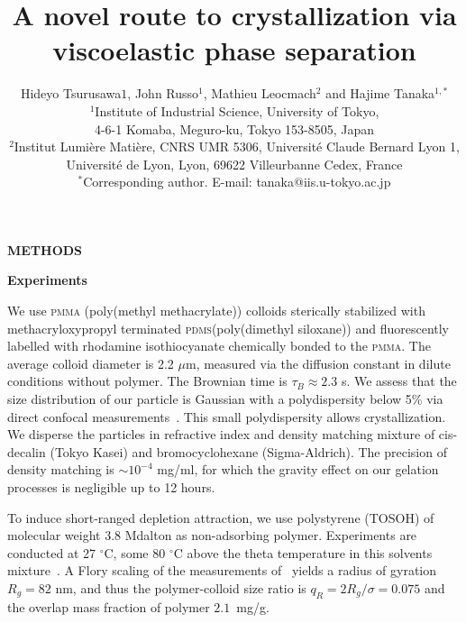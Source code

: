 \documentclass[12pt,onecolumn]{revtex4}
\begin{document}
\title{A novel route to crystallization via viscoelastic phase separation} 

\author{Hideyo Tsurusawa$1$, John Russo$^1$, Mathieu Leocmach$^{2}$ and Hajime Tanaka$^{1,\ast}$ 
\\
\normalsize{$^1$Institute of Industrial Science, University of Tokyo,}\\
\normalsize{4-6-1 Komaba, Meguro-ku, Tokyo 153-8505, Japan}\\
\normalsize{$^2$Institut Lumière Matière, CNRS UMR 5306, Université Claude Bernard Lyon 1, }\\
\normalsize{Université de Lyon, Lyon, 69622 Villeurbanne Cedex, France}\\
\normalsize{$^\ast$Corresponding author. E-mail: tanaka@iis.u-tokyo.ac.jp}}

\maketitle



\noindent
{\bf METHODS}

\noindent
{\bf Experiments}

We use \textsc{pmma} (poly(methyl methacrylate)) colloids sterically stabilized with methacryloxypropyl terminated \textsc{pdms}(poly(dimethyl siloxane)) and fluorescently labelled with rhodamine isothiocyanate chemically bonded to the \textsc{pmma}. 
The average colloid diameter is 2.2 $\mu$m, measured via the diffusion constant in dilute conditions without polymer. The Brownian time is $\tau_B \approx 2.3$ s. 
We assess that the size distribution of our particle is Gaussian with a polydispersity below 5\% via direct confocal measurements~\cite{Leocmach2013}.
This small polydispersity allows crystallization.
We disperse the particles in refractive index and density matching mixture of cis-decalin (Tokyo Kasei) and bromocyclohexane (Sigma-Aldrich). 
The precision of density matching is $\sim 10^{-4}$ mg/ml, for which the gravity effect on our gelation processes is negligible up to 12 hours.

To induce short-ranged depletion attraction, we use polystyrene (TOSOH) of molecular weight 3.8 Mdalton as non-adsorbing polymer. 
Experiments are conducted at 27 $^\circ$C, some 80 $^\circ$C above the theta temperature in this solvents mixture~\cite{Royall2007}. A Flory scaling of the measurements of~\cite{lu2008gelation} yields a radius of gyration $R_g=82$ nm, and thus the polymer-colloid size ratio is $q_R=2R_g/\sigma=0.075$ and the overlap mass fraction of polymer $2.1$~mg/g.
\end{document}
